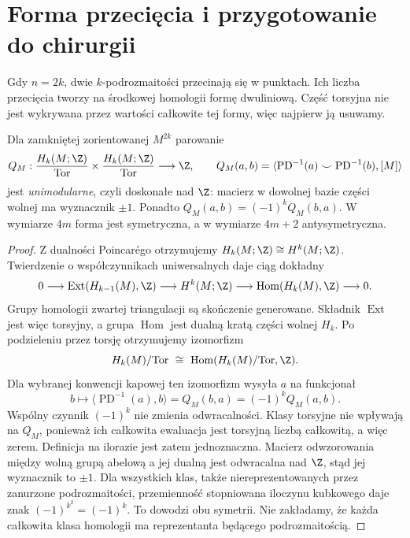 \section{Forma przecięcia i przygotowanie do chirurgii}
\label{sec:forma-przeciecia-16}

Gdy $n=2k$, dwie
$k$-podrozmaitości
przecinają się
w punktach.
Ich liczba przecięcia
tworzy na środkowej
homologii formę
dwuliniową. Część
torsyjna nie jest
wykrywana przez
wartości całkowite
tej formy, więc
najpierw ją usuwamy.

\begin{twierdzenie}
\label{thm:forma-przeciecia-16}
Dla zamkniętej
zorientowanej
$M^{2k}$ parowanie
\[
 Q_M:
 \frac{H_k(M;\Z)}{\mathrm{Tor}}
 \times
 \frac{H_k(M;\Z)}{\mathrm{Tor}}
   \longrightarrow\Z,
 \qquad
 Q_M(a,b)=
 \langle\operatorname{PD}^{-1}(a)
 \smile\operatorname{PD}^{-1}(b),[M]\rangle
\]
jest \emph{unimodularne}, czyli doskonałe nad $\Z$:
macierz w dowolnej bazie
części wolnej ma wyznacznik
$\pm1$. Ponadto
$Q_M(a,b)=(-1)^kQ_M(b,a)$.
W wymiarze $4m$ forma
jest symetryczna, a
w wymiarze $4m+2$
antysymetryczna.
\end{twierdzenie}
\begin{proof}
Z dualności Poincarégo
otrzymujemy
$H_k(M;\Z)\cong H^k(M;\Z)$.
Twierdzenie o
współczynnikach
uniwersalnych daje
ciąg dokładny
\[
0\longrightarrow
 \operatorname{Ext}
     (H_{k-1}(M),\Z)
 \longrightarrow H^k(M;\Z)
 \longrightarrow
 \operatorname{Hom}(H_k(M),\Z)
 \longrightarrow0.
\]
Grupy homologii
zwartej triangulacji
są skończenie
generowane.
Składnik $\operatorname{Ext}$
jest więc torsyjny,
a grupa $\operatorname{Hom}$
jest dualną kratą
części wolnej $H_k$.
Po podzieleniu przez
torsję otrzymujemy
izomorfizm
\[
 H_k(M)/\mathrm{Tor}
 \ \cong\
 \operatorname{Hom}
    (H_k(M)/\mathrm{Tor},\Z).
\]
Dla wybranej konwencji kapowej ten izomorfizm
wysyła $a$ na funkcjonał
\[
 b\longmapsto\langle\operatorname{PD}^{-1}(a),b\rangle
 =Q_M(b,a)=(-1)^kQ_M(a,b).
\]
Wspólny czynnik $(-1)^k$ nie zmienia odwracalności.
Klasy torsyjne nie wpływają na $Q_M$, ponieważ
ich całkowita ewaluacja jest torsyjną liczbą całkowitą,
a więc zerem. Definicja na ilorazie jest zatem jednoznaczna.
Macierz odwzorowania
między wolną grupą
abelową a jej dualną
jest odwracalna nad
$\Z$, stąd jej
wyznacznik to $\pm1$.
Dla wszystkich klas, także niereprezentowanych
przez zanurzone podrozmaitości, przemienność
stopniowana iloczynu kubkowego daje znak
$(-1)^{k^2}=(-1)^k$. To dowodzi obu symetrii.
Nie zakładamy, że każda całkowita klasa homologii
ma reprezentanta będącego podrozmaitością.
\end{proof}

